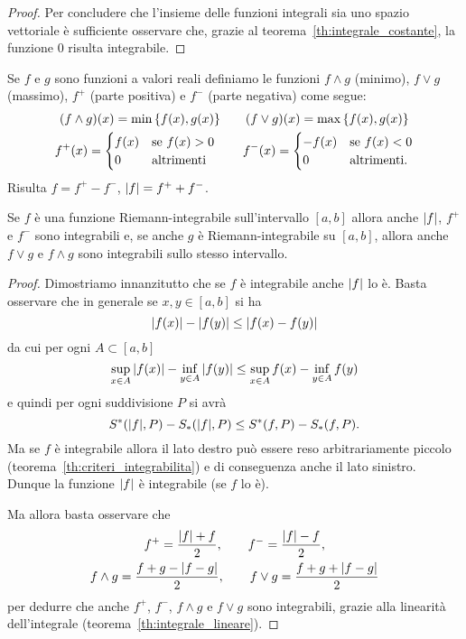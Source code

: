 \begin{proof}
Per concludere che l'insieme delle funzioni integrali sia uno spazio vettoriale
è sufficiente osservare che, grazie al teorema~\ref{th:integrale_costante},
la funzione $0$ risulta integrabile.
\end{proof}

\begin{theorem}
\label{th:reticolo}
Se $f$ e $g$ sono funzioni a valori reali definiamo le
funzioni $f\wedge g$ (minimo), $f \vee g$ (massimo),
$f^+$ (parte positiva) e $f^-$ (parte negativa) come segue:
\begin{gather*}
  (f \wedge g)(x) = \min{\left\{ f(x), g(x) \right\}}  \qquad
  (f \vee g)(x) = \max{\left\{ f(x), g(x) \right\}} \\
  f^+ (x) =
      \begin{cases}
      f(x) & \text{se $f(x)> 0$}\\
      0 & \text{altrimenti}
      \end{cases} \qquad
  f^- (x) =
      \begin{cases}
      -f(x) & \text{se $f(x)< 0$}\\
      0 & \text{altrimenti.}
      \end{cases}
\end{gather*}
Risulta $f= f^+ - f^-$, ${\left|f\right|}=f^+ + f^-$.

Se $f$ è una funzione Riemann-integrabile sull'intervallo $[a,b]$ allora
anche ${\left|f\right|}$, $f^+$ e $f^-$ sono integrabili e, se
anche $g$ è Riemann-integrabile su $[a,b]$, allora anche $f\vee g$ e $f\wedge g$
sono integrabili sullo stesso intervallo.
\end{theorem}
%
\begin{proof}
Dimostriamo innanzitutto che se $f$ è integrabile anche ${\left|f\right|}$ lo è.
Basta osservare che in generale se $x,y\in [a,b]$ si ha
\[
  {\left|f(x)\right|}-{\left|f(y)\right|} \le {\left|f(x) - f(y)\right|}
\]
da cui per ogni $A\subset [a,b]$
\[
  \sup_{x\in A} {\left|f(x)\right|} - \inf_{y\in A} {\left|f(y)\right|} \le
  \sup_{x\in A} f(x) - \inf_{y\in A}f(y)
\]
e quindi per ogni suddivisione $P$ si avrà
\[
  S^*({\left|f\right|},P) - S_*({\left|f\right|}, P) \le S^*(f,P) - S_*(f,P).
\]
Ma se $f$ è integrabile allora il lato destro può essere reso
arbitrariamente piccolo (teorema~\ref{th:criteri_integrabilita})
e di conseguenza anche il lato sinistro.
Dunque la funzione ${\left|f\right|}$ è integrabile (se $f$ lo è).

Ma allora basta osservare che
\begin{gather*}
  f^+ = \frac{{\left|f\right|} + f}{2}, \qquad
  f^- = \frac{{\left|f\right|} - f}{2}, \\
  f\wedge g = \frac{f + g - {\left|f-g\right|}}{2}, \qquad
  f\vee g = \frac{f+g + {\left|f-g\right|}}{2}
\end{gather*}
per dedurre che anche $f^+$, $f^-$, $f\wedge g$ e $f\vee g$
sono integrabili,
 grazie
alla linearità dell'integrale (teorema~\ref{th:integrale_lineare}).
\end{proof}

